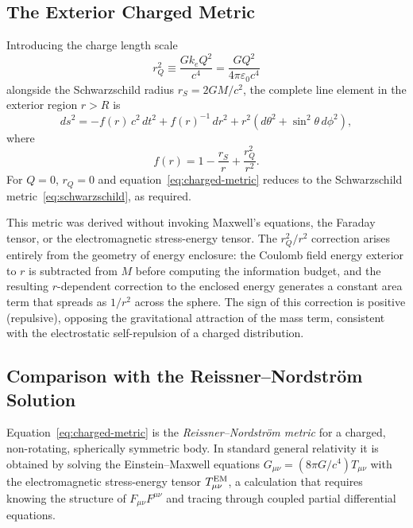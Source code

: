 \documentclass[12pt]{article}
\begin{document}
\subsection{The Exterior Charged Metric}
\label{sec:rn-metric}

Introducing the charge length scale
\begin{equation}
  r_Q^2 \equiv \frac{G k_e Q^2}{c^4}
             = \frac{GQ^2}{4\pi\varepsilon_0 c^4}
  \label{eq:rq}
\end{equation}
alongside the Schwarzschild radius $r_S = 2GM/c^2$, the complete line
element in the exterior region $r > R$ is
\begin{equation}
  ds^2 = -f(r)\,c^2\,dt^2
         + f(r)^{-1}\,dr^2
         + r^2\!\left(d\theta^2 + \sin^2\!\theta\,d\phi^2\right),
  \label{eq:charged-metric}
\end{equation}
where
\begin{equation}
  f(r) = 1 - \frac{r_S}{r} + \frac{r_Q^2}{r^2}.
  \label{eq:rn-f}
\end{equation}
For $Q = 0$, $r_Q = 0$ and equation~\eqref{eq:charged-metric} reduces
to the Schwarzschild metric~\eqref{eq:schwarzschild}, as required.

This metric was derived without invoking Maxwell's equations, the
Faraday tensor, or the electromagnetic stress-energy tensor.
The $r_Q^2/r^2$ correction arises entirely from the geometry of energy
enclosure: the Coulomb field energy exterior to $r$ is subtracted from
$M$ before computing the information budget, and the resulting
$r$-dependent correction to the enclosed energy generates a constant
area term that spreads as $1/r^2$ across the sphere.
The sign of this correction is positive (repulsive), opposing the
gravitational attraction of the mass term, consistent with the
electrostatic self-repulsion of a charged distribution.

\subsection{Comparison with the Reissner--Nordstr\"om Solution}
\label{sec:rn-comparison}

Equation~\eqref{eq:charged-metric} is the
\emph{Reissner--Nordstr\"om metric} \cite{Wald1984} for a charged,
non-rotating, spherically symmetric body.
In standard general relativity it is obtained by solving the
Einstein--Maxwell equations $G_{\mu\nu} = (8\pi G/c^4)T_{\mu\nu}$
with the electromagnetic stress-energy tensor $T_{\mu\nu}^{\rm EM}$,
a calculation that requires knowing the structure of
$F_{\mu\nu}F^{\mu\nu}$ and tracing through coupled partial
differential equations.
\end{document}
